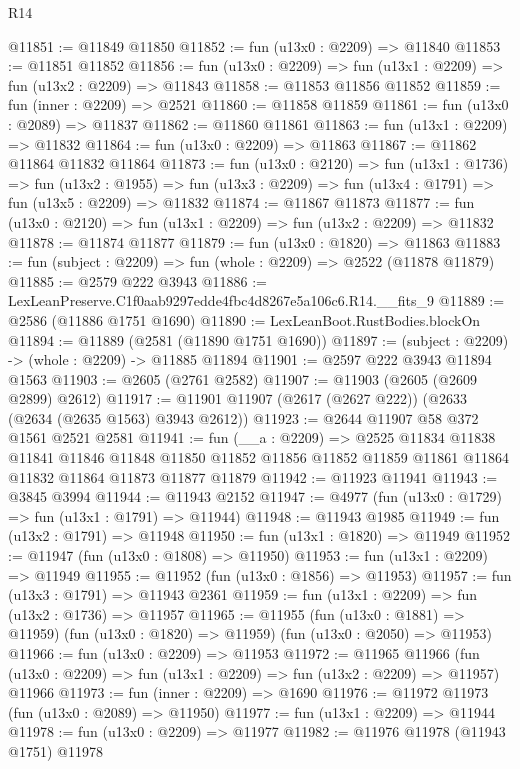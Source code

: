 \begin{lexlean}{R14}
\begin{coremodule}
@11851 := @11849 @11850
@11852 := fun (u13x0 : @2209) => @11840
@11853 := @11851 @11852
@11856 := fun (u13x0 : @2209) => fun (u13x1 : @2209) => fun (u13x2 : @2209) => @11843
@11858 := @11853 @11856 @11852
@11859 := fun (inner : @2209) => @2521
@11860 := @11858 @11859
@11861 := fun (u13x0 : @2089) => @11837
@11862 := @11860 @11861
@11863 := fun (u13x1 : @2209) => @11832
@11864 := fun (u13x0 : @2209) => @11863
@11867 := @11862 @11864 @11832 @11864
@11873 := fun (u13x0 : @2120) =>
  fun (u13x1 : @1736) =>
  fun (u13x2 : @1955) => fun (u13x3 : @2209) => fun (u13x4 : @1791) => fun (u13x5 : @2209) => @11832
@11874 := @11867 @11873
@11877 := fun (u13x0 : @2120) => fun (u13x1 : @2209) => fun (u13x2 : @2209) => @11832
@11878 := @11874 @11877
@11879 := fun (u13x0 : @1820) => @11863
@11883 := fun (subject : @2209) => fun (whole : @2209) => @2522 (@11878 @11879)
@11885 := @2579 @222 @3943
@11886 := LexLeanPreserve.C1f0aab9297edde4fbc4d8267e5a106c6.R14.__fits_9
@11889 := @2586 (@11886 @1751 @1690)
@11890 := LexLeanBoot.RustBodies.blockOn
@11894 := @11889 (@2581 (@11890 @1751 @1690))
@11897 := (subject : @2209) -> (whole : @2209) -> @11885 @11894
@11901 := @2597 @222 @3943 @11894 @1563
@11903 := @2605 (@2761 @2582)
@11907 := @11903 (@2605 (@2609 @2899) @2612)
@11917 := @11901 @11907 (@2617 (@2627 @222)) (@2633 (@2634 (@2635 @1563) @3943 @2612))
@11923 := @2644 @11907 @58 @372 @1561 @2521 @2581
@11941 := fun (__a : @2209) =>
  @2525
    @11834
    @11838
    @11841
    @11846
    @11848
    @11850
    @11852
    @11856
    @11852
    @11859
    @11861
    @11864
    @11832
    @11864
    @11873
    @11877
    @11879
@11942 := @11923 @11941
@11943 := @3845 @3994
@11944 := @11943 @2152
@11947 := @4977 (fun (u13x0 : @1729) => fun (u13x1 : @1791) => @11944)
@11948 := @11943 @1985
@11949 := fun (u13x2 : @1791) => @11948
@11950 := fun (u13x1 : @1820) => @11949
@11952 := @11947 (fun (u13x0 : @1808) => @11950)
@11953 := fun (u13x1 : @2209) => @11949
@11955 := @11952 (fun (u13x0 : @1856) => @11953)
@11957 := fun (u13x3 : @1791) => @11943 @2361
@11959 := fun (u13x1 : @2209) => fun (u13x2 : @1736) => @11957
@11965 := @11955
    (fun (u13x0 : @1881) => @11959)
    (fun (u13x0 : @1820) => @11959)
    (fun (u13x0 : @2050) => @11953)
@11966 := fun (u13x0 : @2209) => @11953
@11972 := @11965
    @11966
    (fun (u13x0 : @2209) => fun (u13x1 : @2209) => fun (u13x2 : @2209) => @11957)
    @11966
@11973 := fun (inner : @2209) => @1690
@11976 := @11972 @11973 (fun (u13x0 : @2089) => @11950)
@11977 := fun (u13x1 : @2209) => @11944
@11978 := fun (u13x0 : @2209) => @11977
@11982 := @11976 @11978 (@11943 @1751) @11978

\end{coremodule}
\end{lexlean}
